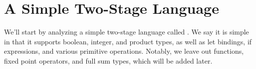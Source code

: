 \documentclass{article}
\begin{document}
%
%
%
%
%

\section{A Simple Two-Stage Language}

We'll start by analyzing a simple two-stage language called \ellStaged.  We say it is simple in that it supports boolean, integer, and product types, as well as let bindings, if expressions, and various primitive operations.  Notably, we leave out functions, fixed point operators, and full sum types, which will be added later.
\end{document}
